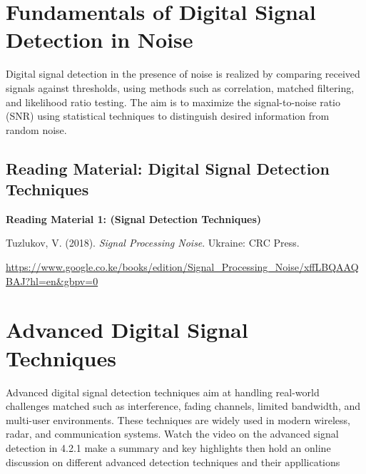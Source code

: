 \documentclass[12pt,a4paper]{article}
\begin{document}
\section*{Fundamentals of Digital Signal Detection in Noise}

Digital signal detection in the presence of noise is realized by comparing received signals against thresholds, using methods such as correlation, matched filtering, and likelihood ratio testing. The aim is to maximize the signal-to-noise ratio (SNR) using statistical techniques to distinguish desired information from random noise.

\subsection*{Reading Material: Digital Signal Detection Techniques}

\textbf{Reading Material 1: (Signal Detection Techniques)}

Tuzlukov, V. (2018). \textit{Signal Processing Noise}. Ukraine: CRC Press.

\url{https://www.google.co.ke/books/edition/Signal_Processing_Noise/xffLBQAAQBAJ?hl=en&gbpv=0}

\section*{Advanced Digital Signal Techniques}

Advanced digital signal detection techniques aim at handling real-world challenges matched such as interference, fading channels, limited bandwidth, and multi-user environments. These techniques are widely used in modern wireless, radar, and communication systems. 
Watch the video on the advanced signal detection in 4.2.1 make a summary and key highlights then hold an online discussion on different advanced detection techniques and their appllications
\end{document}
